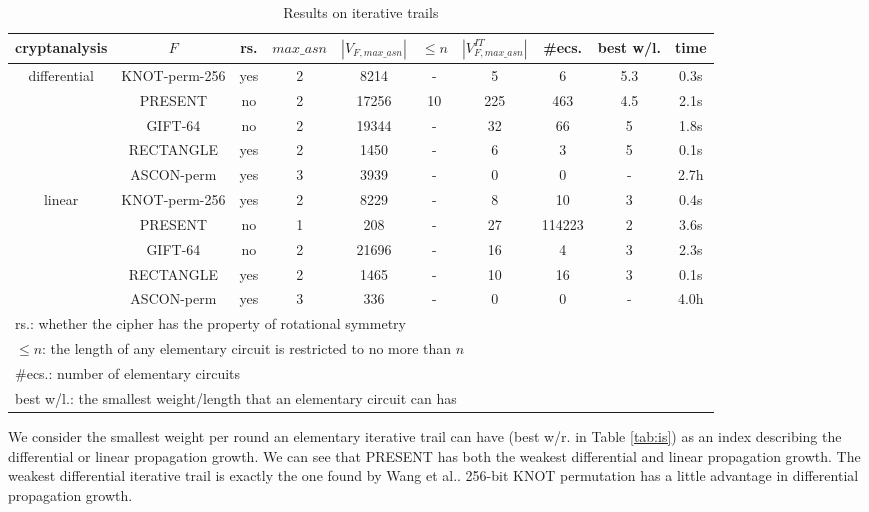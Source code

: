 \begin{table}
	\caption{Results on iterative trails}\label{tab:iterative-trails}
	\centering
	\tiny
	\begin{tabular}{|c|c|c|c|c|c|c|c|c|c|}
		\hline
		cryptanalysis & $F$ & rs. & $max\_asn$ &$|V_{F,max\_asn}|$&$\leq n$& $|V^{IT}_{F,max\_asn}|$ & \#ecs. & best w/l. &time\\
		\hline
		\multirow{5}{*}{differential}
		&KNOT-perm-256 & yes & 2 & 8214 & - & 5 & 6 & 5.3 & 0.3s\\
		\cline{2-10}
		&PRESENT & no & 2 & 17256 & 10 & 225 & 463 & 4.5 & 2.1s\\
		\cline{2-10}
		&GIFT-64 & no & 2 & 19344 & - & 32 & 66 & 5 & 1.8s\\
		\cline{2-10}
		& RECTANGLE & yes & 2 & 1450 & - & 6 & 3 & 5 & 0.1s\\
		\cline{2-10}
		& ASCON-perm & yes & 3 & 3939 & - & 0 & 0 & - & 2.7h\\
		\hline
		\multirow{4}{*}{linear}
		& KNOT-perm-256 & yes & 2 & 8229 & - & 8 & 10 & 3 & 0.4s\\
		\cline{2-10}
		& PRESENT & no & 1 & 208 & - & 27 & 114223 & 2 & 3.6s\\
		\cline{2-10}
		& GIFT-64 & no & 2 & 21696 & - & 16 & 4 & 3 & 2.3s\\
		\cline{2-10}
		& RECTANGLE & yes & 2 & 1465 & - & 10 & 16 & 3 & 0.1s\\
		\cline{2-10}
		& ASCON-perm & yes & 3 & 336 & - & 0 & 0 & - & 4.0h\\
		\hline
		\multicolumn{9}{l}{rs.: whether the cipher has the property of rotational symmetry}\\
		\multicolumn{9}{l}{$\leq n$: the length of any elementary circuit is restricted to no more than $n$}\\
		\multicolumn{9}{l}{\#ecs.: number of elementary circuits}\\
		\multicolumn{9}{l}{best w/l.: the smallest weight/length that an elementary circuit can has}\\
	\end{tabular}
\end{table}

We consider the smallest weight per round an elementary iterative trail can have (best w/r. in Table \ref{tab:is}) as an index describing the differential or linear propagation growth. We can see that PRESENT has both the weakest differential and linear propagation growth. The weakest differential iterative trail is exactly the one found by Wang et al.\cite{W08}. 256-bit KNOT permutation has a little advantage in differential propagation growth. 


